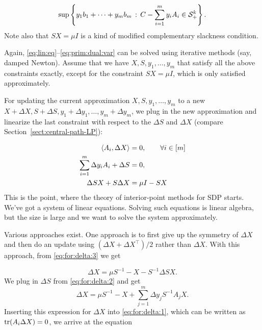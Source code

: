 \[
	\sup \left\{ y_1 b_1 + \cdots + y_m b_m \,:\,  C - \sum_{i=1}^m y_i A_i \in \mathcal{S}_+^k \right\}.
\]
%
Note also that $S X  = \mu I$ is a kind of modified complementary slackness condition.

Again, \eqref{eq:lin:eq}--\eqref{eq:prim:dual:var} can be solved using iterative methods (say, damped Newton). Assume that we have $X,S,y_1,\ldots,y_m$ that satisfy all the above constraints exactly, except for the constraint $S X = \mu I$, which is only satisfied approximately.

For updating the current approximation $X,S,y_1,\ldots,y_m$ to a new $X+\Delta{X}, S + \Delta{S}, y_1 + \Delta{y_1},\ldots,y_m + \Delta{y_m}$, we plug in the new approximation and linearize the last constraint with respect to the $\Delta{S}$ and $\Delta{X}$ (compare Section~\ref{sect:central-path-LP}):

\begin{align}
	\left\langle A_i , \Delta X \right\rangle & = 0, \qquad \forall i \in [m] \label{eq:for:delta:1}
	\\ \sum_{i=1}^m \Delta{y_i} A_i + \Delta{S} & = 0,\label{eq:for:delta:2}
	\\ \Delta{S} X + S \Delta{X} & = \mu I - S X \label{eq:for:delta:3}
\end{align}
%
This is the point, where the theory of interior-point methods for SDP starts. We've got a system of linear equations. Solving such equations is linear algebra, but the size is large and we want to solve the system approximately. 

Various approaches exist. One approach is to first give up the symmetry of $\Delta{X}$ and then do an update using  $(\Delta{X} + \Delta{X}^\top) /2$ rather than $\Delta{X}$. With this approach, from \eqref{eq:for:delta:3} we get 

\[
	\Delta{X} = \mu S^{-1} - X - S^{-1} \Delta{S} X.
\]
We plug in $\Delta{S}$ from \eqref{eq:for:delta:2} and get 
\[
	\Delta{X} = \mu S^{-1} - X + \sum_{j=1}^m \Delta{y}_j S^{-1} A_j X.
\]
%
Inserting this expression for $\Delta{X}$ into \eqref{eq:for:delta:1}, which can be written as \mbox{$\operatorname{tr}(A_i \Delta{X}) = 0$}, we arrive at the equation 

